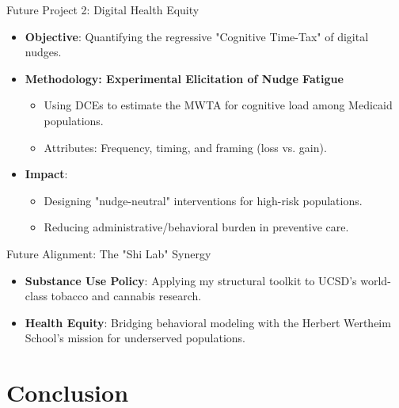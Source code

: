 \documentclass[10pt]{beamer}
\begin{document}
\begin{frame}{Future Project 2: Digital Health Equity}
    \begin{itemize}
        \item \textbf{Objective}: Quantifying the regressive \alert{"Cognitive Time-Tax"} of digital nudges.
        \item \textbf{Methodology: Experimental Elicitation of Nudge Fatigue}
            \begin{itemize}
                \item Using DCEs to estimate the \alert{MWTA for cognitive load} among Medicaid populations.
                \item Attributes: Frequency, timing, and framing (loss vs. gain).
            \end{itemize}
        \item \textbf{Impact}:
            \begin{itemize}
                \item Designing "nudge-neutral" interventions for high-risk populations.
                \item Reducing administrative/behavioral burden in preventive care.
            \end{itemize}
    \end{itemize}
\end{frame}

\begin{frame}{Future Alignment: The "Shi Lab" Synergy}
    \begin{itemize}
        \item \textbf{Substance Use Policy}: Applying my structural toolkit to UCSD's world-class tobacco and cannabis research.
        \item \textbf{Health Equity}: Bridging behavioral modeling with the Herbert Wertheim School’s mission for underserved populations.
    \end{itemize}
\end{frame}

\section{Conclusion}
\end{document}
